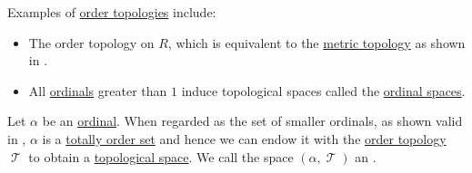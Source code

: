 \begin{example}\label{ex:def:order_topology}
  Examples of \hyperref[def:order_topology]{order topologies} include:
  \begin{itemize}
    \item The order topology on \( R \), which is equivalent to the \hyperref[def:metric_topology]{metric topology} as shown in .

    \item All \hyperref[def:ordinal]{ordinals} greater than \( 1 \) induce topological spaces called the \hyperref[def:ordinal_space]{ordinal spaces}.
  \end{itemize}
\end{example}

\begin{definition}\label{def:ordinal_space}
  Let \( \alpha \) be an \hyperref[def:ordinal]{ordinal}. When regarded as the set of smaller ordinals, as shown valid in , \( \alpha \) is a \hyperref[def:totally_ordered_set]{totally order set} and hence we can endow it with the \hyperref[def:order_topology]{order topology} \( \mscrT \) to obtain a \hyperref[def:topological_space]{topological space}. We call the space \( (\alpha, \mscrT) \) an .
\end{definition}

